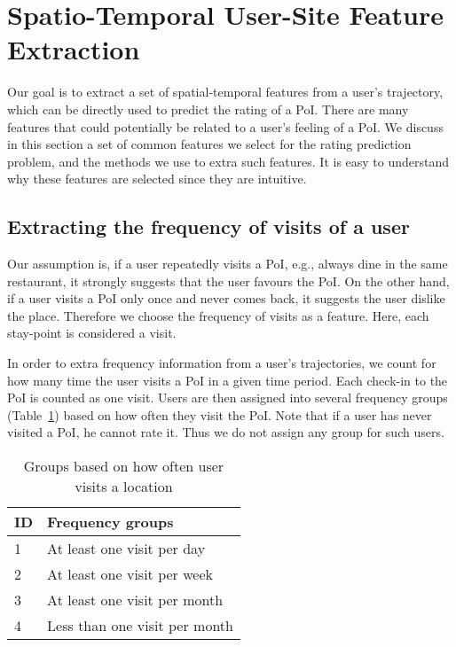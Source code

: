 \section{Spatio-Temporal User-Site Feature Extraction}
\label{sec:method}

Our goal is to extract a set of spatial-temporal features from a user's trajectory, which can be directly used to predict the rating of a PoI. There are many features that could potentially be related to a user's feeling of a PoI. We discuss in this section a set of common features we select for the rating prediction problem, and the methods we use to extra such features. It is easy to understand why these features are selected since they are intuitive.

\subsection{Extracting the frequency of visits of a user}

Our assumption is, if a user repeatedly visits a PoI, e.g., always dine in the same restaurant, it strongly suggests that the user favours the PoI. On the other hand, if a user visits a PoI only once and never comes back, it suggests the user dislike the place. Therefore we choose the frequency of visits as a feature. Here, each stay-point is considered a visit.

In order to extra frequency information from a user's trajectories, we count for how many time the user visits a PoI in a given time period. Each check-in to the PoI is counted as one visit. Users are then assigned into several frequency groups (Table~\ref{frequencyGroups}) based on how often they visit the PoI. Note that if a user has never visited a PoI, he cannot rate it. Thus we do not assign any group for such users.

\begin{table}[htbp]
\begin{center}
\caption{Groups based on how often user visits a location \label{frequencyGroups}}
\begin{tabular}{|l|l|} \hline
ID & \textbf{Frequency groups} \\ \hline
1 & At least one visit per day \\ \hline
2 & At least one visit per week \\ \hline
3 & At least one visit per month \\ \hline
4 & Less than one visit per month \\ \hline
\end{tabular}
\end{center}
\end{table}

